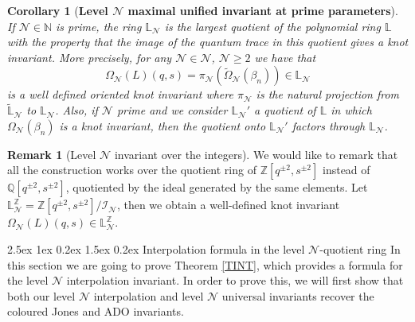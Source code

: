 \documentclass[reqno,a4paper,11pt]{amsart}
\makeatletter
\numberwithin{equation}{section}
\numberwithin{figure}{section}
\theoremstyle{definition}
\newtheorem{rmk}[defn]{Remark}
\theoremstyle{plain}
\newtheorem{coro}[defn]{Corollary}
\renewcommand*{\section}{\@startsection{section}{1}{\z@}%
	{2.5ex \@plus 1ex \@minus 0.2ex}%
	{1.5ex \@plus 0.2ex}%
	{\normalfont\normalsize\bfseries}}
\newcommand{\Q}{\mathbb Q}
\newcommand{\Z}{\mathbb Z}
\newcommand{\Li}{{\mathbb L}}
\newcommand{\Liq}{\mathbb L}
\newcommand{\cI}{\mathcal{I}}
\newcommand{\cN}{\mathcal{N}}
\renewcommand{\geq}{\geqslant}
\makeatother
\begin{document}
%
\begin{coro}[{\bf Level $\cN$ maximal unified invariant at prime parameters}]
\label{coro:COROLLARY}
If $\cN \in \mathbb N$ is prime, the ring $\Liq_{\cN}$ is the largest quotient of the polynomial ring $\Li$ with the property that the image of the quantum trace in this quotient gives a knot invariant. 
%
More precisely, for any $\cN \in \cN$, $\cN\geq 2$ we have that 
\[
\Omega_{\cN}(L)(q,s) = \pi_{\cN}(\widetilde{\Omega}_{\cN}(\beta_n)) \in \Li_{\cN}
\]
 is a well defined oriented knot invariant where $\pi_\cN$ is the natural projection from $\widetilde\Li_\cN$ to $\Li_\cN$. 
 Also, if $\cN$ prime and we consider $\Li_{\cN}'$ a quotient of $ \Li$ in which $\Omega_{\cN}(\beta_n)$ is a knot invariant, then the quotient onto $\Li_{\cN}'$ factors through $\Li_{\cN}$.
\end{coro}
%
\begin{rmk}
[Level $\cN$ invariant over the integers]
\label{ringz} 
We would like to remark that all the construction works over the quotient ring of $\Z[q^{\pm2}, s^{\pm 2}]$ instead of $\Q[q^{\pm2}, s^{\pm 2}]$, quotiented by the ideal generated by the same elements. 
Let $\Li^{\Z}_{\cN} = \Z[q^{\pm2}, s^{\pm 2}]/\cI_\cN$, then we obtain a well-defined knot invariant
$\Omega_{\cN}(L)(q,s) \in \Li^{\Z}_{\cN}$.
\end{rmk}
%
%
 \section{Interpolation formula in the level $\cN$-quotient ring}
 \label{rec}
  In this section we are going to prove Theorem \ref{TINT}, which provides a formula for the level $\cN$ interpolation invariant. In order to prove this, we will first show that both our level $\cN$ interpolation and level $\cN$ universal invariants recover the coloured Jones and ADO invariants.
%
% 
\end{document}
